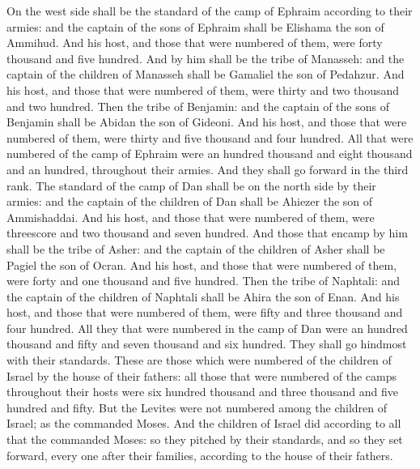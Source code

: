 \begin{biblechapter}
\verse On the west side shall be the standard of the camp of Ephraim according to their armies: and the captain of the sons of Ephraim shall be Elishama the son of Ammihud.
\verse And his host, and those that were numbered of them, were forty thousand and five hundred.
\verse And by him shall be the tribe of Manasseh: and the captain of the children of Manasseh shall be Gamaliel the son of Pedahzur.
\verse And his host, and those that were numbered of them, were thirty and two thousand and two hundred.
\verse Then the tribe of Benjamin: and the captain of the sons of Benjamin shall be Abidan the son of Gideoni.
\verse And his host, and those that were numbered of them, were thirty and five thousand and four hundred.
\verse All that were numbered of the camp of Ephraim were an hundred thousand and eight thousand and an hundred, throughout their armies. And they shall go forward in the third rank.
\verse The standard of the camp of Dan shall be on the north side by their armies: and the captain of the children of Dan shall be Ahiezer the son of Ammishaddai.
\verse And his host, and those that were numbered of them, were threescore and two thousand and seven hundred.
\verse And those that encamp by him shall be the tribe of Asher: and the captain of the children of Asher shall be Pagiel the son of Ocran.
\verse And his host, and those that were numbered of them, were forty and one thousand and five hundred.
\verse Then the tribe of Naphtali: and the captain of the children of Naphtali shall be Ahira the son of Enan.
\verse And his host, and those that were numbered of them, were fifty and three thousand and four hundred.
\verse All they that were numbered in the camp of Dan were an hundred thousand and fifty and seven thousand and six hundred. They shall go hindmost with their standards.
\verse These are those which were numbered of the children of Israel by the house of their fathers: all those that were numbered of the camps throughout their hosts were six hundred thousand and three thousand and five hundred and fifty.
\verse But the Levites were not numbered among the children of Israel; as the \LORD commanded Moses.
\verse And the children of Israel did according to all that the \LORD commanded Moses: so they pitched by their standards, and so they set forward, every one after their families, according to the house of their fathers.
\end{biblechapter}

